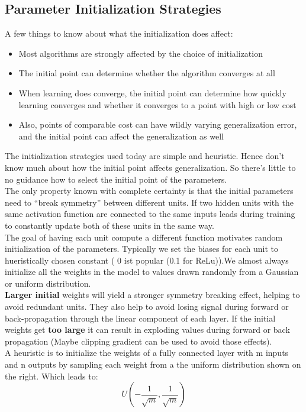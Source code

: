 \begin{multicols}{2}
	
	\subsection{Parameter Initialization Strategies }
	A few things to know about what the initialization does affect:
	\begin{itemize}
		\item Most algorithms are strongly affected by the choice of initialization
		\item The initial point can determine whether the algorithm converges at all
		\item When learning does converge, the initial point can determine how quickly learning converges and whether it converges to a point with high or low cost
		\item Also, points of comparable cost can have wildly varying generalization error, and the initial point can affect the generalization as well
	\end{itemize}
	
	The initialization strategies used today are simple and heuristic. Hence don't know much about
	how the initial point affects generalization. So there's little to no guidance how to select the initial point of the parameters.\\
	The only property known with complete certainty is that the initial parameters need to “break symmetry” between different units. If two hidden units with the same activation function are connected to the same inputs leads during training to constantly update both of these units in the same way.\\
	The goal of having each unit compute a different function motivates	random initialization of the parameters. Typically we set the biases for each unit to hueristically chosen constant ( 0 ist popular (0.1 for ReLu)).We almost always initialize all the weights in the model to values drawn randomly from a Gaussian or uniform distribution.\\
	\textbf{Larger initial }weights will yield a stronger symmetry breaking effect, helping to avoid redundant units. They also help to avoid losing signal during forward or back-propagation through the linear component of each layer. If the initial weights get \textbf{too large} it can result in exploding values during forward or back propagation (Maybe clipping gradient can be used to avoid those effects).\\
	
	A heuristic is to initialize the weights of a fully connected layer with m inputs and n outputs by sampling each weight from a the uniform distribution shown on the right. Which leads to:
	\[  U(-\frac{1}{\sqrt{m}}, \frac{1}{\sqrt{m}}) \]
	

\end{multicols}
